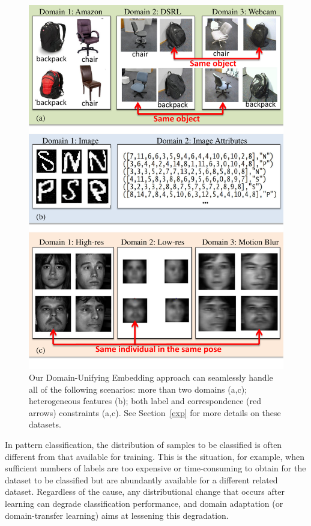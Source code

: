 \documentclass[10pt,twocolumn,letterpaper]{article}
\begin{document}
\begin{figure}[t]
\begin{center}
\includegraphics[width=\columnwidth]{due-fig.pdf}
\end{center}
\vspace{-0.2in}
\caption{Our Domain-Unifying Embedding approach can seamlessly handle all of the following scenarios: more than two domains (a,c); heterogeneous features (b); both label and correspondence (red arrows) constraints (a,c). See Section~\ref{exp} for more details on these datasets.}
\label{illu}
\end{figure}


In pattern classification, the distribution of samples to be classified is often different from that available for training. This is the situation, for example, when sufficient numbers of labels are too expensive or time-consuming to obtain for the dataset to be classified but are abundantly available for a different related dataset. Regardless of the cause, any distributional change that occurs after learning can degrade classification performance, and domain adaptation (or domain-transfer learning) \cite{Daume:DA, Ben-David:analysis,Blitzer:DA,Ben-David:DA, Pan:survey} aims at lessening this degradation.
\end{document}
